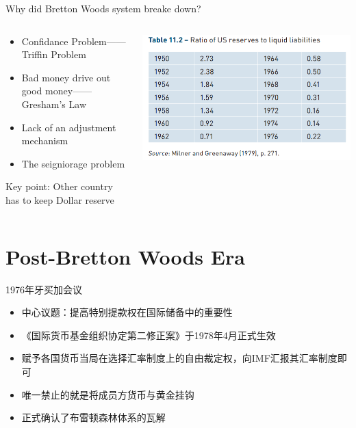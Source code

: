 \documentclass[10pt,hyperref={CJKbookmarks=true},xcolor=dvipsnames,aspectratio=169]{beamer}
\begin{document}
\begin{frame}{Why did Bretton Woods system breake down?}
\begin{columns}[onlytextwidth]
	\begin{column}{0.5\textwidth}
		\begin{itemize}			
		\item Confidance Problem——Triffin Problem
		\item Bad money drive out good money——Gresham's Law
		\item Lack of an adjustment mechanism
		\item The seigniorage problem
		\end{itemize}
	\begin{block}{}
		Key point: Other country has to keep Dollar reserve
	\end{block}
	\end{column}
	\begin{column}{0.5\textwidth}
		\centering
		\includegraphics[scale=0.5]{fig/systems/triffin}
	\end{column}
\end{columns}
	
\end{frame}



\section{Post-Bretton Woods Era}
\begin{frame}{1976年牙买加会议}
	\begin{itemize}
		\item 中心议题：提高特别提款权在国际储备中的重要性
		\item 《国际货币基金组织协定第二修正案》于1978年4月正式生效
		\item 赋予各国货币当局在选择汇率制度上的自由裁定权，向IMF汇报其汇率制度即可
		\item 唯一禁止的就是将成员方货币与黄金挂钩
		\item 正式确认了布雷顿森林体系的瓦解
	\end{itemize}
\end{frame}
\end{document}
